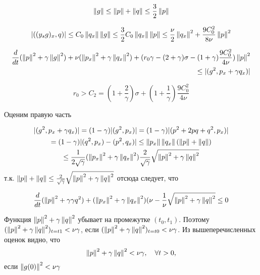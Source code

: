     \begin{equation}
        \left\lVert g\right\rVert \le \left\lVert p\right\rVert + \left\lVert q\right\rVert \le \frac{3}{2} \left\lVert p\right\rVert
    \end{equation}

    \begin{gather*}
        |((y_s g)_x, q)| \le C_0 \left\lVert q_x\right\rVert \left\lVert g\right\rVert \le \frac{3}{2} C_0
        \left\lVert q_x\right\rVert \left\lVert p\right\rVert \le \frac{\nu}{2} \left\lVert q_x\right\rVert^2 + \frac{9C_0^2}{8\nu}
        \left\lVert p\right\rVert^2
    \end{gather*}

    \begin{align*}
        \frac{d}{dt}(\left\lVert p\right\rVert^2 + \gamma \left\lVert g\right\rVert^2) + \nu(\left\lVert p_x\right\rVert^2 + \gamma
        \left\lVert q_x\right\rVert^2) + (r_0\gamma - (2 + \gamma)\sigma - (1 +
        \gamma)\frac{9C_0^2}{4\nu})\left\lVert p\right\rVert^2 \\* \le |(g^2, p_x + \gamma q_x)|
    \end{align*}

    \begin{equation}
        r_0 > C_2 = (1 + \frac{2}{\gamma})\sigma + (1 +
        \frac{1}{\gamma})\frac{9C_0^2}{4\nu}
    \end{equation}

    Оценим правую часть 

    \begin{gather*}
        |(g^2, p_x + \gamma q_x)| = (1 - \gamma)|(g^2, p_x)| = (1 - \gamma)|(p^2
        + 2pq + q^2, p_x)| \\*
        = (1 - \gamma)|(q^2, p_x) - (p^2, q_x)| \le \left\lVert p_x\right\rVert \left\lVert q_x\right\rVert
        (\left\lVert p\right\rVert + \left\lVert q\right\rVert) \\* \le
        \frac{1}{2\sqrt{\gamma}}(\left\lVert p_x\right\rVert^2 + \gamma \left\lVert q_x\right\rVert^2)
        \frac{2}{\sqrt{\gamma}}\sqrt{\left\lVert p\right\rVert^2 + \gamma \left\lVert q\right\rVert^2}
    \end{gather*}
    т.к. $\left\lVert p\right\rVert + \left\lVert q\right\rVert \le \frac{2}{\sqrt{\gamma}}\sqrt{\left\lVert p\right\rVert^2 +
        \gamma \left\lVert q\right\rVert^2}$ отсюда следует, что

    \begin{equation}
        \frac{d}{dt}(\left\lVert p\right\rVert^2 + \gamma \gamma{q}^2) + (\left\lVert p_x\right\rVert^2 + \gamma
        \left\lVert q_x\right\rVert^2) (\nu - \frac{1}{\nu} \sqrt{\left\lVert p\right\rVert^2 + \gamma \left\lVert q\right\rVert^2}
        \le 0
    \end{equation}

    Функция $\left\lVert p\right\rVert^2 + \gamma \left\lVert q\right\rVert^2$ убывает на промежутке $(t_0, t_1)$.
    Поэтому $(\left\lVert p\right\rVert^2 + \gamma \left\lVert q\right\rVert^2)_{t=t1} < \nu \gamma$, если 
    $(\left\lVert p\right\rVert^2 + \gamma \left\lVert q\right\rVert^2)_{t=t0} < \nu \gamma$. Из вышеперечисленных
    оценок видно, что 
    \begin{equation}\label{10}
        \left\lVert p\right\rVert^2 + \gamma \left\lVert q\right\rVert^2 < \nu \gamma, \quad \forall t > 0,
    \end{equation}
    если $\left\lVert g(0)\right\rVert^2 < \nu \gamma$\\

